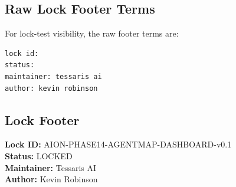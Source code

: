 \subsection{Raw Lock Footer Terms}

For lock-test visibility, the raw footer terms are:

\begin{verbatim}
lock id:
status:
maintainer: tessaris ai
author: kevin robinson
\end{verbatim}

\subsection{Lock Footer}

\textbf{Lock ID:} AION-PHASE14-AGENTMAP-DASHBOARD-v0.1\\
\textbf{Status:} LOCKED\\
\textbf{Maintainer:} Tessaris AI\\
\textbf{Author:} Kevin Robinson

